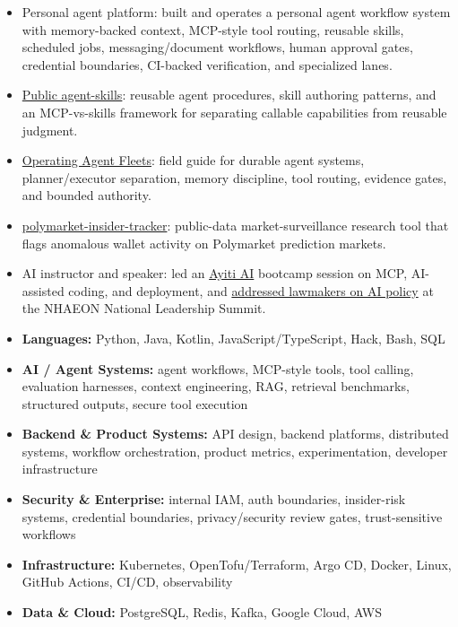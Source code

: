 \newpage
{}
\begin{itemize}
  \item Personal agent platform: built and operates a personal agent workflow system with memory-backed context, MCP-style tool routing, reusable skills, scheduled jobs, messaging/document workflows, human approval gates, credential boundaries, CI-backed verification, and specialized lanes.
  \item \href{https://github.com/selamy-labs/agent-skills}{Public agent-skills}: reusable agent procedures, skill authoring patterns, and an MCP-vs-skills framework for separating callable capabilities from reusable judgment.
  \item \href{https://github.com/pselamy/operating-agent-fleets}{Operating Agent Fleets}: field guide for durable agent systems, planner/executor separation, memory discipline, tool routing, evidence gates, and bounded authority.
  \item \href{https://github.com/pselamy/polymarket-insider-tracker}{polymarket-insider-tracker}: public-data market-surveillance research tool that flags anomalous wallet activity on Polymarket prediction markets.
  \item AI instructor and speaker: led an \href{https://www.ayiti.ai/en/training}{Ayiti AI} bootcamp session on MCP, AI-assisted coding, and deployment, and \href{https://www.linkedin.com/posts/patrickselamy_ai-publicpolicy-leadership-activity-7423430343493505025-nuPe}{addressed lawmakers on AI policy} at the NHAEON National Leadership Summit.
\end{itemize}

\begin{itemize}[leftmargin=0em,label={},itemsep=1pt,topsep=2pt]
  \item \textbf{Languages:} Python, Java, Kotlin, JavaScript/TypeScript, Hack, Bash, SQL
  \item \textbf{AI / Agent Systems:} agent workflows, MCP-style tools, tool calling, evaluation harnesses, context engineering, RAG, retrieval benchmarks, structured outputs, secure tool execution
  \item \textbf{Backend \& Product Systems:} API design, backend platforms, distributed systems, workflow orchestration, product metrics, experimentation, developer infrastructure
  \item \textbf{Security \& Enterprise:} internal IAM, auth boundaries, insider-risk systems, credential boundaries, privacy/security review gates, trust-sensitive workflows
  \item \textbf{Infrastructure:} Kubernetes, OpenTofu/Terraform, Argo CD, Docker, Linux, GitHub Actions, CI/CD, observability
  \item \textbf{Data \& Cloud:} PostgreSQL, Redis, Kafka, Google Cloud, AWS
\end{itemize}

